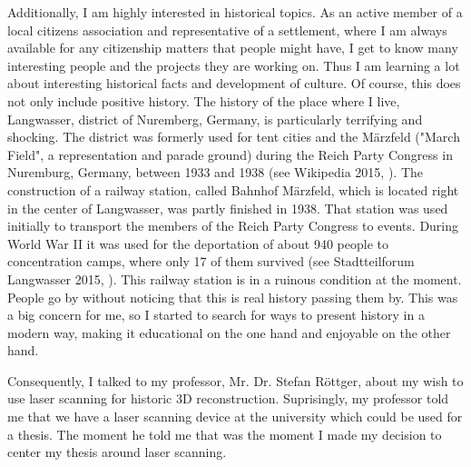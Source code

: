 Additionally, I am highly interested in historical topics. As an active member of a local citizens association and representative of a settlement, where I am always available for any citizenship matters that people might have, I get to know many interesting people and the projects they are working on. Thus I am learning a lot about interesting historical facts and development of culture. Of course, this does not only include positive history. The history of the place where I live, Langwasser, district of Nuremberg, Germany, is particularly terrifying and shocking. The district was formerly used for tent cities and the Märzfeld ("March Field", a representation and parade ground) during the Reich Party Congress in Nuremburg, Germany, between 1933 and 1938 (see Wikipedia 2015, \parencite{wiki:NaziPartyRallyGround}). The construction of a railway station, called Bahnhof Märzfeld, which is located right in the center of Langwasser, was partly finished in 1938. That station was used initially to transport the members of the Reich Party Congress to events. During World War II it was used for the deportation of about 940 people to concentration camps, where only 17 of them survived (see Stadtteilforum Langwasser 2015, \parencite{StadtteilforumTafel6}). This railway station is in a ruinous condition at the moment. People go by without noticing that this is real history passing them by. This was a big concern for me, so I started to search for ways to present history in a modern way, making it educational on the one hand and enjoyable on the other hand.

Consequently, I talked to my professor, Mr. Dr. Stefan Röttger, about my wish to use laser scanning for historic 3D reconstruction. Suprisingly, my professor told me that we have a laser scanning device at the university which could be used for a thesis. The moment he told me that was the moment I made my decision to center my thesis around laser scanning.

